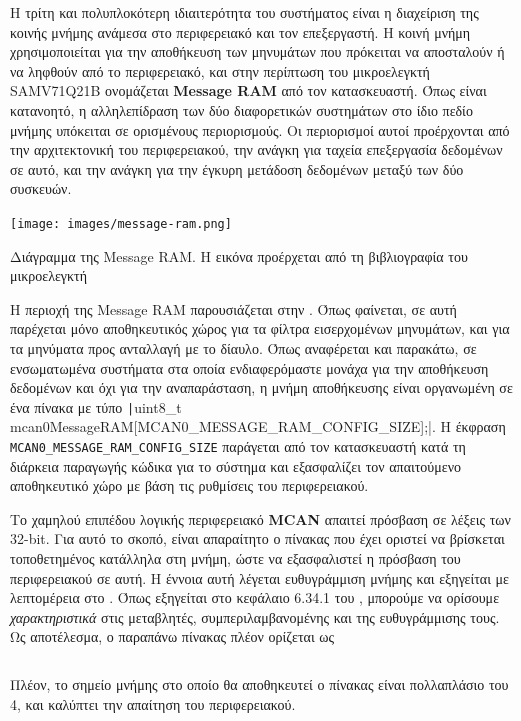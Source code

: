 \documentclass[a4paper,nobib,justified]{tufte-book}
\begin{document}
Η τρίτη και πολυπλοκότερη ιδιαιτερότητα του συστήματος είναι η διαχείριση της κοινής μνήμης ανάμεσα στο περιφερειακό και τον επεξεργαστή. Η κοινή μνήμη χρησιμοποιείται για την αποθήκευση των μηνυμάτων που πρόκειται να αποσταλούν ή να ληφθούν από το περιφερειακό, και στην περίπτωση του μικροελεγκτή SAMV71Q21B ονομάζεται \textbf{Message RAM}  από τον κατασκευαστή. Όπως είναι κατανοητό, η αλληλεπίδραση των δύο διαφορετικών συστημάτων στο ίδιο πεδίο μνήμης υπόκειται σε ορισμένους περιορισμούς. Οι περιορισμοί αυτοί προέρχονται από την αρχιτεκτονική του περιφερειακού, την ανάγκη για ταχεία επεξεργασία δεδομένων σε αυτό, και την ανάγκη για την έγκυρη μετάδοση δεδομένων μεταξύ των δύο συσκευών.

\begin{marginfigure}
	\centering
	\texttt{[image: images/message-ram.png]}
	\label{fig:message-ram}
	\caption[Διάγραμμα της Message RAM]{Διάγραμμα της Message RAM. Η εικόνα προέρχεται από τη βιβλιογραφία του μικροελεγκτή}
\end{marginfigure}

Η περιοχή της Message RAM παρουσιάζεται στην . Όπως φαίνεται, σε αυτή παρέχεται μόνο αποθηκευτικός χώρος για τα φίλτρα εισερχομένων μηνυμάτων, και για τα μηνύματα προς ανταλλαγή με το δίαυλο. Όπως αναφέρεται και παρακάτω, σε ενσωματωμένα συστήματα στα οποία ενδιαφερόμαστε μονάχα για την αποθήκευση δεδομένων και όχι για την αναπαράσταση, η μνήμη αποθήκευσης είναι οργανωμένη σε ένα πίνακα με τύπο \texttt|uint8_t mcan0MessageRAM[MCAN0_MESSAGE_RAM_CONFIG_SIZE];|. Η έκφραση \texttt{MCAN0\_MESSAGE\_RAM\_CONFIG\_SIZE} παράγεται από τον κατασκευαστή κατά τη διάρκεια παραγωγής κώδικα για το σύστημα και εξασφαλίζει τον απαιτούμενο αποθηκευτικό χώρο με βάση τις ρυθμίσεις του περιφερειακού.

Το χαμηλού επιπέδου λογικής περιφερειακό \textbf{MCAN} απαιτεί πρόσβαση σε λέξεις των 32-bit. Για αυτό το σκοπό, είναι απαραίτητο ο πίνακας που έχει οριστεί να βρίσκεται τοποθετημένος κατάλληλα στη μνήμη, ώστε να εξασφαλιστεί η πρόσβαση του περιφερειακού σε αυτή. Η έννοια αυτή λέγεται ευθυγράμμιση μνήμης και εξηγείται με λεπτομέρεια στο . Όπως εξηγείται στο κεφάλαιο 6.34.1 του , μπορούμε να ορίσουμε \emph{χαρακτηριστικά} στις μεταβλητές, συμπεριλαμβανομένης και της ευθυγράμμισης τους. Ως αποτέλεσμα, ο παραπάνω πίνακας πλέον ορίζεται ως \inputminted{c++}{code/examples/message-ram/alignment.cpp} Πλέον, το σημείο μνήμης στο οποίο θα αποθηκευτεί ο πίνακας είναι πολλαπλάσιο του 4, και καλύπτει την απαίτηση του περιφερειακού.
\end{document}
